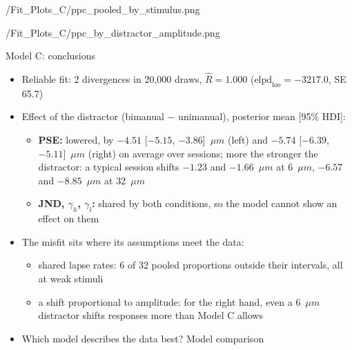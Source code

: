   {\plotsC/Fit_Plots_C/ppc_pooled_by_stimulus.png}

  {\plotsC/Fit_Plots_C/ppc_by_distractor_amplitude.png}

\begin{frame}{Model C: conclusions}
  \small
  \begin{itemize}
    \item Reliable fit: 2 divergences in 20{,}000 draws, $\hat{R} = 1.000$
          ($\text{elpd}_\text{loo} = -3217.0$, SE 65.7)
    \item Effect of the distractor (bimanual $-$ unimanual), posterior mean [95\% HDI]:
    \begin{itemize}
      \item \textbf{PSE:} lowered, by $-4.51$ [$-5.15$, $-3.86$]~$\mu m$ (left) and
            $-5.74$ [$-6.39$, $-5.11$]~$\mu m$ (right) on average over sessions; more the stronger
            the distractor: a typical session shifts $-1.23$ and $-1.66$~$\mu m$ at 6~$\mu m$,
            $-6.57$ and $-8.85$~$\mu m$ at 32~$\mu m$
      \item \textbf{JND, \boldmath$\gamma_h$, \boldmath$\gamma_l$:} shared by both conditions, so
            the model cannot show an effect on them
    \end{itemize}
    \item The misfit sits where its assumptions meet the data:
    \begin{itemize}
      \item shared lapse rates: 6 of 32 pooled proportions outside their intervals, all at weak
            stimuli
      \item a shift proportional to amplitude: for the right hand, even a 6~$\mu m$ distractor
            shifts responses more than Model C allows
    \end{itemize}
    \item[$\Rightarrow$] Which model describes the data best? Model comparison
  \end{itemize}
\end{frame}
